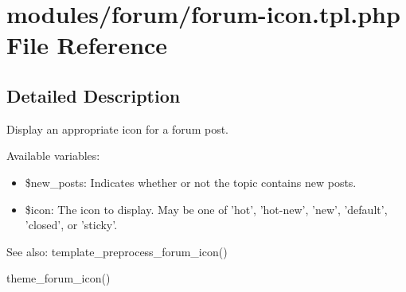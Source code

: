 \hypertarget{forum-icon_8tpl_8php}{
\section{modules/forum/forum-icon.tpl.php File Reference}
\label{forum-icon_8tpl_8php}
}


\subsection{Detailed Description}
Display an appropriate icon for a forum post.

Available variables:\begin{itemize}
\item \$new\_\-posts: Indicates whether or not the topic contains new posts.\item \$icon: The icon to display. May be one of 'hot', 'hot-new', 'new', 'default', 'closed', or 'sticky'.\end{itemize}


\begin{Desc}
\item[See also:]template\_\-preprocess\_\-forum\_\-icon() 

theme\_\-forum\_\-icon() \end{Desc}
